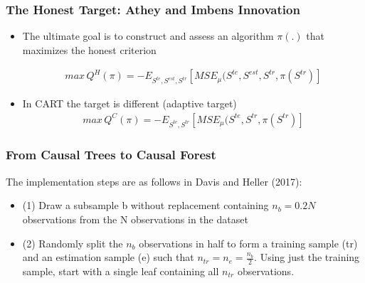 \documentclass[
  shownotes,
  xcolor={svgnames},
  hyperref={colorlinks,citecolor=DarkBlue,linkcolor=DarkRed,urlcolor=DarkBlue}
  , aspectratio=169]{beamer}
\begin{document}
\begin{frame}[fragile]
\frametitle{The Honest Target: Athey and Imbens Innovation}


\begin{itemize}
\item The ultimate goal is to construct and assess an algorithm $\pi(.)$ that maximizes the honest criterion

\medskip
\begin{align}
max\,Q^{H}(\pi)=-E_{S^{te},S^{est},S^{tr}}\left[MSE_{\mu}(S^{te},S^{est},S^{tr},\pi(S^{tr})\right]
\end{align}


\item In CART the target is different (adaptive target)
\medskip
\begin{align}
max\,Q^{C}(\pi)=-E_{S^{te},S^{tr}}\left[MSE_{\mu}(S^{te},S^{tr},\pi(S^{tr})\right]
\end{align}


\end{itemize}

\end{frame}
\begin{frame}[fragile]
\frametitle{From Causal Trees to Causal Forest}


The implementation steps are as follows in Davis and Heller (2017):
\medskip
\begin{itemize}


\item (1) Draw a subsample b without replacement containing $n_b = 0.2N$ observations from the N observations in the dataset
\medskip
\item (2) Randomly split the $n_b$ observations in half to form a training sample (tr) and an estimation sample (e) such that $n_{tr}=n_e=\frac{n_b}{2}$. Using just the training sample, start with a single leaf containing all $n_{tr}$ observations.

\end{itemize}

\end{frame}
\end{document}

